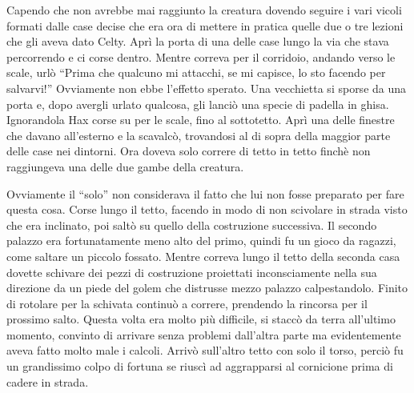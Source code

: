     Capendo che non avrebbe mai raggiunto la creatura dovendo seguire i
    vari vicoli formati dalle case decise che era ora di mettere in pratica
    quelle due o tre lezioni che gli aveva dato Celty. Aprì la porta di una
    delle case lungo la via che stava percorrendo e ci corse dentro. Mentre
    correva per il corridoio, andando verso le scale, urlò ``Prima che
    qualcuno mi attacchi, se mi capisce, lo sto facendo per salvarvi!''
    Ovviamente non ebbe l'effetto sperato. Una vecchietta si sporse da una
    porta e, dopo avergli urlato qualcosa, gli lanciò una specie di padella
    in ghisa. Ignorandola Hax corse su per le scale, fino al sottotetto.
    Aprì una delle finestre che davano all'esterno e la scavalcò,
    trovandosi al di sopra della maggior parte delle case nei dintorni. Ora
    doveva solo correre di tetto in tetto finchè non raggiungeva una delle
    due gambe della creatura.

    Ovviamente il ``solo'' non considerava il fatto che lui non fosse
    preparato per fare questa cosa. Corse lungo il tetto, facendo in modo
    di non scivolare in strada visto che era inclinato, poi saltò su quello
    della costruzione successiva. Il secondo palazzo era fortunatamente
    meno alto del primo, quindi fu un gioco da ragazzi, come saltare un
    piccolo fossato. Mentre correva lungo il tetto della seconda casa
    dovette schivare dei pezzi di costruzione proiettati inconsciamente
    nella sua direzione da un piede del golem che distrusse mezzo palazzo
    calpestandolo. Finito di rotolare per la schivata continuò a correre,
    prendendo la rincorsa per il prossimo salto. Questa volta era molto più
    difficile, si staccò da terra all'ultimo momento, convinto di arrivare
    senza problemi dall'altra parte ma evidentemente aveva fatto molto male
    i calcoli. Arrivò sull'altro
    tetto con solo il torso, perciò fu un grandissimo colpo di fortuna se
    riuscì ad aggrapparsi al cornicione prima di cadere in strada.

